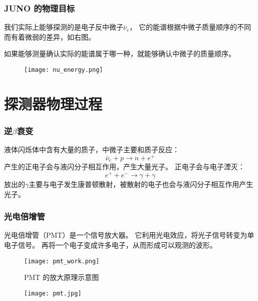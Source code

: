 \documentclass[aspectratio=169]{beamer}
\begin{document}
\begin{frame}
    \frametitle{JUNO 的物理目标}

    \begin{multicols}{2}
        我们实际上能够探测的是电子反中微子$\bar{\nu}_e$，
        它的能谱根据中微子质量顺序的不同而有着微弱的差异，如右图。

        如果能够测量确认实际的能谱属于哪一种，就能够确认中微子的质量顺序。
        \columnbreak
        \begin{figure}
            \centering
            \texttt{[image: nu\_energy.png]}
        \end{figure}
    \end{multicols}

\end{frame}
\section{探测器物理过程}
\begin{frame}
    \frametitle{逆$\beta$衰变}

    液体闪烁体中含有大量的质子，中微子主要和质子反应：
    \begin{equation*}
        \bar{\nu}_e+p\to n+e^+
    \end{equation*}
    产生的正电子会与液闪分子相互作用，产生大量光子。
    正电子会与电子湮灭：
    \begin{equation*}
        e^+ +e^-\to\gamma+\gamma
    \end{equation*}
    放出的$\gamma$主要与电子发生康普顿散射，被散射的电子也会与液闪分子相互作用产生光子。

\end{frame}

\begin{frame}
    \frametitle{光电倍增管}

    \begin{multicols}{2}
        光电倍增管（PMT）是一个信号放大器。
        它利用光电效应，将光子信号转变为单电子信号。
        再将一个电子变成许多电子，从而形成可以观测的波形。

        \begin{figure}
            \centering
            \texttt{[image: pmt\_work.png]}
            \caption{PMT 的放大原理示意图}
        \end{figure}
        \columnbreak
        \begin{figure}
            \centering
            \texttt{[image: pmt.jpg]}
        \end{figure}
    \end{multicols}

\end{frame}
\end{document}
